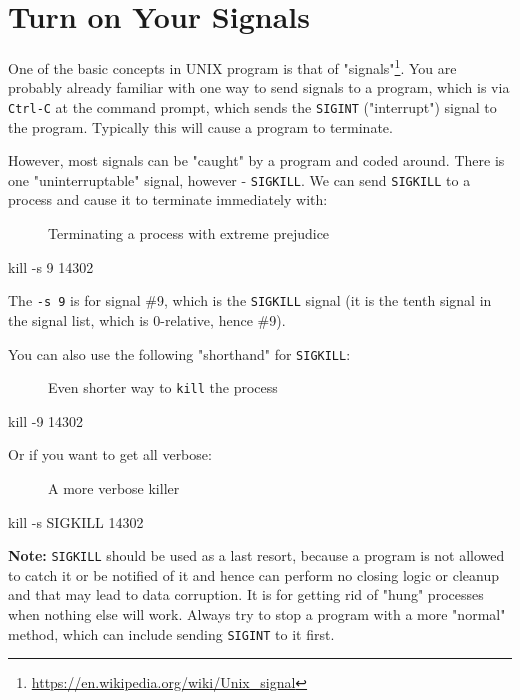 \documentclass[10pt,american,]{book}
\newenvironment{Shaded}{\begin{snugshade}}{\end{snugshade}}
\newcommand{\KeywordTok}[1]{\textcolor[rgb]{0.13,0.29,0.53}{\textbf{{#1}}}}
\newcommand{\NormalTok}[1]{{#1}}
\renewcommand{\href}[2]{#2\footnote{\url{#1}}}
\numberwithin{figure}{chapter}
\DeclareRobustCommand{\drcap}[1]{\begin{figure}[H]\caption{#1}\end{figure}}
\renewcommand{\KeywordTok}[1]{{#1}}
\renewcommand{\NormalTok}[1]{{#1}}
\begin{document}
\section*{Turn on Your Signals}\label{turn-on-your-signals}

One of the basic concepts in UNIX program is that of
\href{https://en.wikipedia.org/wiki/Unix_signal}{"signals"}. You are
probably already familiar with one way to send signals to a program,
which is via \texttt{Ctrl-C} at the command prompt, which sends the
\texttt{SIGINT} ("interrupt") signal to the program. Typically this will
cause a program to terminate. 

However, most signals can be "caught" by a program and coded around.
There is one "uninterruptable" signal, however - \texttt{SIGKILL}. We
can send \texttt{SIGKILL} to a process and cause it to terminate
immediately with:

\drcap{Terminating a process with extreme prejudice}

\begin{Shaded}
\begin{Highlighting}[]
\KeywordTok{kill} \NormalTok{-s 9 14302}
\end{Highlighting}
\end{Shaded}

The \texttt{-s\ 9} is for signal \#9, which is the \texttt{SIGKILL}
signal (it is the tenth signal in the signal list, which is 0-relative,
hence \#9).

You can also use the following "shorthand" for \texttt{SIGKILL}:

\drcap{Even shorter way to \texttt{kill} the process}

\begin{Shaded}
\begin{Highlighting}[]
\KeywordTok{kill} \NormalTok{-9 14302}
\end{Highlighting}
\end{Shaded}

Or if you want to get all verbose:

\drcap{A more verbose killer}

\begin{Shaded}
\begin{Highlighting}[]
\KeywordTok{kill} \NormalTok{-s SIGKILL 14302}
\end{Highlighting}
\end{Shaded}

\textbf{Note:} \texttt{SIGKILL} should be used as a last resort, because
a program is not allowed to catch it or be notified of it and hence can
perform no closing logic or cleanup and that may lead to data
corruption. It is for getting rid of "hung" processes when nothing else
will work. Always try to stop a program with a more "normal" method,
which can include sending \texttt{SIGINT} to it first.
\end{document}
